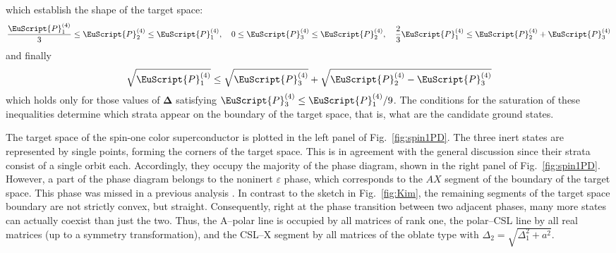 \documentclass[final,3p,times,12pt,a4paper,sort&compress]{elsarticle}
\newcommand\PP{\EuScript{P}}                %
\newcommand\ve{\varepsilon}
\newcommand\op{\mathbf\Delta}               %
\begin{document}
which establish the shape of the target space:
\begin{equation}
\frac{\PP^{(4)}_1}3\leq\PP^{(4)}_2\leq\PP^{(4)}_1,\quad
0\leq\PP^{(4)}_3\leq\PP^{(4)}_2,\quad
\frac23\PP^{(4)}_1\leq\PP^{(4)}_2+\PP^{(4)}_3
\end{equation}
and finally
\begin{equation}
\sqrt{\PP^{(4)}_1}\leq\sqrt{\PP^{(4)}_3}+\sqrt{\PP^{(4)}_2-\PP^{(4)}_3}
\end{equation}
which holds only for those values of $\op$ satisfying
$\PP^{(4)}_3\leq\PP^{(4)}_1/9$. The conditions for the saturation of these
inequalities determine which strata appear on the boundary of the target space,
that is, what are the candidate ground states.

The target space of the spin-one color superconductor is plotted in
the left panel of Fig.~\ref{fig:spin1PD}. The three inert states are represented
by single points, forming the corners of the target space. This is in
agreement with the general discussion since their strata consist of a single
orbit each. Accordingly, they occupy the majority of the phase diagram, shown in
the right panel of Fig.~\ref{fig:spin1PD}. However, a part of the phase diagram
belongs to the noninert $\ve$ phase, which corresponds to the $AX$ segment of
the boundary of the target space. This phase was missed in a previous analysis
\cite{Bailin:1983bm}. In contrast to the sketch in Fig.~\ref{fig:Kim}, the
remaining segments of the target space boundary are not strictly convex, but
straight. Consequently, right at the phase transition between two adjacent
phases, many more states can actually coexist than just the two. Thus, the
A--polar line is occupied by all matrices of rank one, the polar--CSL
line by all real matrices (up to a symmetry transformation), and the CSL--X
segment by all matrices of the oblate type with
$\Delta_2=\sqrt{\Delta_1^2+a^2}$.
\end{document}
